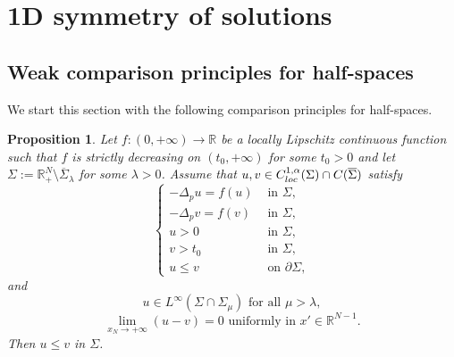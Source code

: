 \documentclass[reqno]{amsart}
\theoremstyle{plain}
\newtheorem{proposition}[theorem]{Proposition}
\theoremstyle{definition}
\theoremstyle{remark}
\begin{document}
	\section{1D symmetry of solutions}\label{sect4}
	
	\subsection{Weak comparison principles for half-spaces}
	We start this section with the following comparison principles for half-spaces.
	\begin{proposition}\label{prop:wcp2}
		Let $f:(0,+\infty)\to\mathbb{R}$ be a locally Lipschitz continuous function such that $f$ is strictly decreasing on $(t_0,+\infty)$ for some $t_0>0$ and let $\Sigma := \mathbb{R}^N_+\setminus \overline\Sigma_\lambda$ for some $\lambda>0$. Assume that $u, v \in C^{1,\alpha}_{\rm loc}(\Sigma) \cap C(\overline{\Sigma})$ satisfy
		\[
		\begin{cases}
			-\Delta_p u = f(u) &\text{ in } \Sigma,\\
			-\Delta_p v = f(v) &\text{ in } \Sigma,\\
			u>0 &\text{ in } \Sigma,\\
			v>t_0 &\text{ in } \Sigma,\\
			u \le v &\text{ on } \partial\Sigma,
		\end{cases}
		\]
		and
		\[
		u\in L^\infty(\Sigma\cap\Sigma_\mu)\text{ for all } \mu>\lambda,
		\]
		\begin{equation}\label{lim}
			\lim_{x_N\to+\infty} (u-v) = 0 \text{ uniformly in } x'\in\mathbb{R}^{N-1}.
		\end{equation}
		Then $u\le v$ in $\Sigma$.
	\end{proposition}
\end{document}
